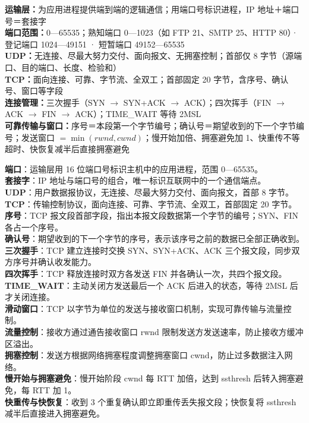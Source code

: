 \documentclass[a4paper,11pt]{article}
\begin{document}

\begin{knowmap}
\textbf{运输层：}为应用进程提供端到端的逻辑通信；用端口号标识进程，IP 地址＋端口号＝套接字\\[2pt]
\textbf{端口范围：}0—65535；熟知端口 0—1023（如 FTP 21、SMTP 25、HTTP 80）· 登记端口 1024—49151 · 短暂端口 49152—65535\\[2pt]
\textbf{UDP：}无连接、尽最大努力交付、面向报文、无拥塞控制；首部仅 8 字节（源端口、目的端口、长度、检验和）\\[2pt]
\textbf{TCP：}面向连接、可靠、字节流、全双工；首部固定 20 字节，含序号、确认号、窗口等字段\\[2pt]
\textbf{连接管理：}三次握手（SYN $\rightarrow$ SYN+ACK $\rightarrow$ ACK）；四次挥手（FIN $\rightarrow$ ACK $\rightarrow$ FIN $\rightarrow$ ACK）；TIME\_WAIT 等待 2MSL\\[2pt]
\textbf{可靠传输与窗口：}序号＝本段第一个字节编号；确认号＝期望收到的下一个字节编号；发送窗口 $=\min(rwnd,cwnd)$；慢开始加倍、拥塞避免加 1、快重传不等超时、快恢复减半后直接拥塞避免
\end{knowmap}

\begin{keyterms}
\textbf{端口}：运输层用 16 位端口号标识主机中的应用进程，范围 0—65535。\\
\textbf{套接字}：IP 地址与端口号的组合，唯一标识互联网中的一个通信端点。\\
\textbf{UDP}：用户数据报协议，无连接、尽最大努力交付、面向报文，首部 8 字节。\\
\textbf{TCP}：传输控制协议，面向连接、可靠、字节流、全双工，首部固定 20 字节。\\
\textbf{序号}：TCP 报文段首部字段，指出本报文段数据第一个字节的编号；SYN、FIN 各占一个序号。\\
\textbf{确认号}：期望收到的下一个字节的序号，表示该序号之前的数据已全部正确收到。\\
\textbf{三次握手}：TCP 建立连接时交换 SYN、SYN+ACK、ACK 三个报文段，同步双方序号并确认收发能力。\\
\textbf{四次挥手}：TCP 释放连接时双方各发送 FIN 并各确认一次，共四个报文段。\\
\textbf{TIME\_WAIT}：主动关闭方发送最后一个 ACK 后进入的状态，等待 2MSL 后才关闭连接。\\
\textbf{滑动窗口}：TCP 以字节为单位的发送与接收窗口机制，实现可靠传输与流量控制。\\
\textbf{流量控制}：接收方通过通告接收窗口 rwnd 限制发送方发送速率，防止接收方缓冲区溢出。\\
\textbf{拥塞控制}：发送方根据网络拥塞程度调整拥塞窗口 cwnd，防止过多数据注入网络。\\
\textbf{慢开始与拥塞避免}：慢开始阶段 cwnd 每 RTT 加倍，达到 ssthresh 后转入拥塞避免，每 RTT 加 1。\\
\textbf{快重传与快恢复}：收到 3 个重复确认即立即重传丢失报文段；快恢复将 ssthresh 减半后直接进入拥塞避免。
\end{keyterms}
\end{document}
